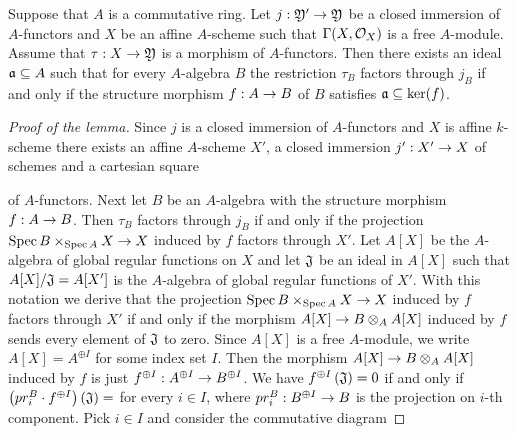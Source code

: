 \begin{lemma}\label{lemma:for_affine_local_factorization}
Suppose that $A$ is a commutative ring. Let $j:{\mathfrak Y}'\rightarrow {\mathfrak Y}$ be a closed immersion of $A$-functors and $X$ be an affine $A$-scheme such that $\Gamma(X,{\mathcal O}_X)$ is a free $A$-module. Assume that $\tau:X\rightarrow {\mathfrak Y}$ is a morphism of $A$-functors. Then there exists an ideal $\mathfrak{a}\subseteq A$ such that for every $A$-algebra $B$ the restriction $\tau_B$ factors through $j_B$ if and only if the structure morphism $f:A\rightarrow B$ of $B$ satisfies $\mathfrak{a}\subseteq \ker(f)$.
\end{lemma}
\begin{proof}[Proof of the lemma]
Since $j$ is a closed immersion of $A$-functors and $X$ is affine $k$-scheme there exists an affine $A$-scheme $X'$, a closed immersion $j':X'\rightarrow X$ of schemes and a cartesian square
\begin{center}
\end{center}
of $A$-functors. Next let $B$ be an $A$-algebra with the structure morphism $f:A\rightarrow B$. Then $\tau_B$ factors through $j_B$ if and only if the projection $\mathrm{Spec}\, B\times_{\mathrm{Spec}\, A}X\rightarrow X$ induced by $f$ factors through $X'$. Let $A[X]$ be the $A$-algebra of global regular functions on $X$ and let $\mathfrak{J}$ be an ideal in $A[X]$ such that $A[X]/\mathfrak{J} = A[X']$ is the $A$-algebra of global regular functions of $X'$. With this notation we derive that the projection $\mathrm{Spec}\, B\times_{\mathrm{Spec}\, A}X\rightarrow X$ induced by $f$ factors through $X'$ if and only if the morphism $A[X]\rightarrow B\otimes_AA[X]$ induced by $f$ sends every element of $\mathfrak{J}$ to zero. Since $A[X]$ is a free $A$-module, we write $A[X] = A^{\oplus I}$ for some index set $I$. Then the morphism $A[X]\rightarrow B\otimes_AA[X]$ induced by $f$ is just $f^{\oplus I}:A^{\oplus I}\rightarrow B^{\oplus I}$. We have $f^{\oplus I}\left(\mathfrak{J}\right)=0$ if and only if $\left(pr^B_i\cdot f^{\oplus I}\right)\left(\mathfrak{J}\right)=$ for every $i\in I$, where $pr^B_i:B^{\oplus I}\rightarrow B$ is the projection on $i$-th component. Pick $i\in I$ and consider the commutative diagram

\end{proof}
